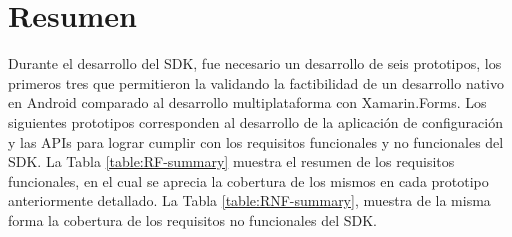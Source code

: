 \section{Resumen}

Durante el desarrollo del SDK, fue necesario un desarrollo de seis prototipos, los primeros tres que permitieron la validando la factibilidad de un desarrollo nativo en Android comparado al desarrollo multiplataforma con Xamarin.Forms. Los siguientes prototipos corresponden al desarrollo de la aplicación de configuración y las APIs para lograr cumplir con los requisitos funcionales y no funcionales del SDK. La Tabla \ref{table:RF-summary}
muestra el resumen de los requisitos funcionales, en el cual se aprecia la cobertura de los mismos en cada prototipo anteriormente detallado. La Tabla \ref{table:RNF-summary}, muestra de la misma forma la cobertura de los requisitos no funcionales del SDK.



